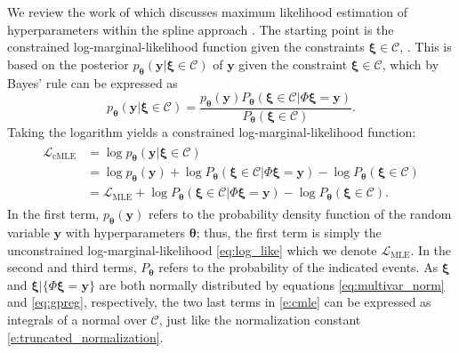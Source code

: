 \label{sec:mle}
We review the work of  which discusses maximum likelihood estimation of hyperparameters within the spline approach . 
The starting point is the constrained log-marginal-likelihood function given the constraints $\bm{\xi} \in \mathcal{C}$, .
This is based on the posterior  $p_{\bm{\theta}}(\mathbf{y} | \bm{\xi} \in \mathcal{C})$ of $\mathbf{y}$ given the constraint $\bm{\xi} \in \mathcal{C}$, which by Bayes' rule can be expressed as
\begin{equation}
p_{\bm{\theta}}(\mathbf{y} | \bm{\xi} \in \mathcal{C}) = 
\frac{p_{\bm{\theta}}(\mathbf{y}) P_{\bm{\theta}}(\bm{\xi} \in \mathcal{C} | \Phi \bm{\xi} = \mathbf{y})}{P_{\bm{\theta}}(\bm{\xi} \in \mathcal{C})}.
\end{equation}
Taking the logarithm yields a constrained log-marginal-likelihood function:
\begin{align}
\begin{split}
\label{e:cmle}
\mathcal{L}_{\text{cMLE}}
&=
\log p_{\bm{\theta}}(\mathbf{y} | \bm{\xi} \in \mathcal{C}) \\
&= 
\log p_{\bm{\theta}}(\mathbf{y}) + \log P_{\bm{\theta}}(\bm{\xi} \in \mathcal{C} | \Phi \bm{\xi} = \mathbf{y})  - \log P_{\bm{\theta}}(\bm{\xi} \in \mathcal{C}) \\
&=\mathcal{L}_{\text{MLE}} + \log P_{\bm{\theta}}(\bm{\xi} \in \mathcal{C} | \Phi \bm{\xi} = \mathbf{y})  - \log P_{\bm{\theta}}(\bm{\xi} \in \mathcal{C}).
\end{split}
\end{align}
In the first term, $p_{\bm{\theta}}(\mathbf{y})$ refers to the probability density function of the random variable $\mathbf{y}$ with hyperparameters $\bm{\theta}$; thus, the first term is simply the unconstrained log-marginal-likelihood \eqref{eq:log_like} which we denote $\mathcal{L}_{\text{MLE}}$. In the second and third terms, $P_{\bm{\theta}}$ refers to the probability of the indicated events. 
As $\bm{\xi}$ and  $\bm{\xi} | \{\Phi \bm{\xi} = \mathbf{y}\}$ are both normally distributed by equations \eqref{eq:multivar_norm} and \eqref{eq:gpreg}, respectively, the two last terms in \eqref{e:cmle} can be expressed as integrals of a normal  over 
$\mathcal{C}$, just like the normalization constant \eqref{e:truncated_normalization}.
